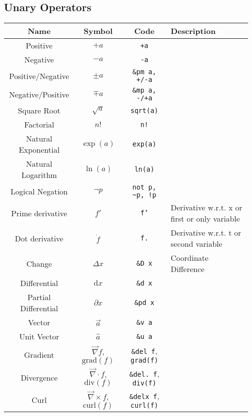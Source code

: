 \documentclass{article}
\begin{document}
  \newpage

  \subsection{Unary Operators} %
  \label{sub:unary_ops}
  \begin{table}[!h]
    \centering
    \begin{tabular}{|c|c|c|l|}
      \hline
      \textbf{Name} & \textbf{Symbol} & \textbf{Code} & \textbf{Description} \\
      \hline\hline

      Positive & \( +a \) & \texttt{+a} & \\
      Negative & \( -a \) & \texttt{-a} & \\
      Positive/Negative & \( \pm a \) & \texttt{\&pm a, +/-a} & \\
      Negative/Positive & \( \mp a \) & \texttt{\&mp a, -/+a} & \\
      Square Root & \( \sqrt{a} \) & \texttt{sqrt(a)} & \\
      Factorial & \( n! \) & \texttt{n!} & \\
      Natural Exponential & \( \exp(a) \) & \texttt{exp(a)} & \\
      Natural Logarithm & \( \ln(a) \) & \texttt{ln(a)} & \\
      Logical Negation & \( \neg p \) & \texttt{not p, \~{}p, !p} & \\
      \hline
      Prime derivative & \( f' \) & \texttt{f'} & Derivative w.r.t. x or first or only variable\\
      Dot derivative & \( \dot{f} \) & \texttt{f.} & Derivative w.r.t. t or second variable\\
      Change & \( \Delta x \) & \texttt{\&D x} & Coordinate Difference \\
      Differential & \( \mathrm{d}x \) & \texttt{\&d x} & \\
      Partial Differential & \( \partial x \) & \texttt{\&pd x} & \\
      Vector & \( \vec{a} \) & \texttt{\&v a} & \\
      Unit Vector & \( \hat{a} \) & \texttt{\&u a} & \\
      \hline
      Gradient & \( \vec{\nabla} f \), \( \mathrm{grad}(f) \) & \texttt{\&del f}, \texttt{grad(f)} & \\
      Divergence & \( \vec{\nabla} \cdot f \), \( \mathrm{div}(f) \) & \texttt{\&del. f}, \texttt{div(f)} & \\
      Curl & \( \vec{\nabla} \times f \), \( \mathrm{curl}(f) \) & \texttt{\&delx f}, \texttt{curl(f)} & \\
      \hline
    \end{tabular}
  \end{table}
  
\end{document}
